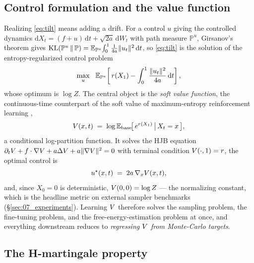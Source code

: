 \subsection{Control formulation and the value function}

Realizing \eqref{eq:tilt} means adding a drift. For a control $u$ giving the
controlled dynamics $\mathrm{d}X_t=(f+u)\,\mathrm{d}t+\sqrt{2a}\,\mathrm{d}W_t$
with path measure $\mathbb{P}^{u}$, Girsanov's theorem gives
$\mathrm{KL}(\mathbb{P}^{u}\,\|\,\mathbb{P})=\mathbb{E}_{\mathbb{P}^u}\!\int_0^1
\tfrac{1}{4a}\|u_t\|^{2}\,\mathrm{d}t$, so \eqref{eq:tilt} is the solution of
the entropy-regularized control problem \citep{daipra1991stochastic,leonard2014survey}
\begin{equation}
  \max_{u}\ \ \mathbb{E}_{\mathbb{P}^{u}}\!\left[\,r(X_1)
    - \int_0^1 \frac{\|u_t\|^{2}}{4a}\,\mathrm{d}t\right],
  \label{eq:control}
\end{equation}
whose optimum is $\log Z$. The central object is the \emph{soft value function}, the continuous-time
counterpart of the soft value of maximum-entropy reinforcement learning
\citep{haarnoja2017softq,levine2018rlasinference},
\begin{equation}
  V(x,t) \;=\; \log \mathbb{E}_{\mathrm{base}}\!\big[\,e^{r(X_1)} \,\big|\, X_t=x\,\big],
  \label{eq:value}
\end{equation}
a conditional log-partition function. It solves the HJB equation
$\partial_t V + f\cdot\nabla V + a\Delta V + a\|\nabla V\|^{2}=0$ with
terminal condition $V(\cdot,1)=r$, the optimal control is
\begin{equation}
  u^{\star}(x,t) \;=\; 2a\,\nabla_x V(x,t),
  \label{eq:optimal-control}
\end{equation}
and, since $X_0=0$ is deterministic, $V(0,0)=\log Z$ --- the normalizing
constant, which is the headline metric on external sampler benchmarks
(\S\ref{sec:07_experiments}). Learning $V$ therefore solves the sampling
problem, the fine-tuning problem, and the free-energy-estimation problem at
once, and everything downstream reduces to \emph{regressing $V$ from
Monte-Carlo targets}.

\subsection{The H-martingale property}
\label{subsec:hmartingale}

